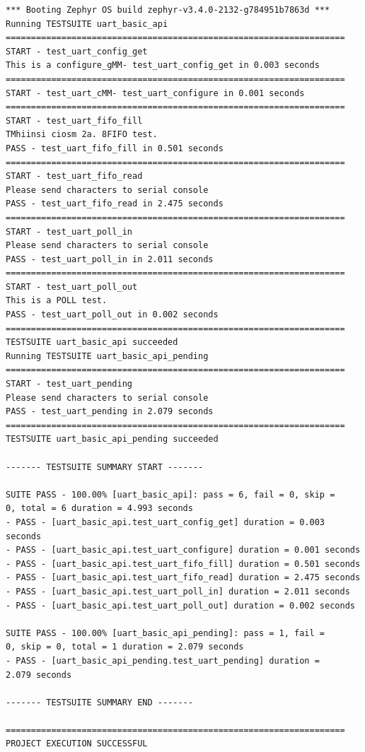 \documentclass[11pt,a4paper,oneside]{article}
\begin{document}
\begin{lstlisting}
*** Booting Zephyr OS build zephyr-v3.4.0-2132-g784951b7863d ***
Running TESTSUITE uart_basic_api
===================================================================
START - test_uart_config_get
This is a configure_gMM- test_uart_config_get in 0.003 seconds
===================================================================
START - test_uart_cMM- test_uart_configure in 0.001 seconds
===================================================================
START - test_uart_fifo_fill
TMhiinsi ciosm 2a. 8FIFO test.
PASS - test_uart_fifo_fill in 0.501 seconds
===================================================================
START - test_uart_fifo_read
Please send characters to serial console
PASS - test_uart_fifo_read in 2.475 seconds
===================================================================
START - test_uart_poll_in
Please send characters to serial console
PASS - test_uart_poll_in in 2.011 seconds
===================================================================
START - test_uart_poll_out
This is a POLL test.
PASS - test_uart_poll_out in 0.002 seconds
===================================================================
TESTSUITE uart_basic_api succeeded
Running TESTSUITE uart_basic_api_pending
===================================================================
START - test_uart_pending
Please send characters to serial console
PASS - test_uart_pending in 2.079 seconds
===================================================================
TESTSUITE uart_basic_api_pending succeeded

------- TESTSUITE SUMMARY START -------

SUITE PASS - 100.00% [uart_basic_api]: pass = 6, fail = 0, skip =
0, total = 6 duration = 4.993 seconds
- PASS - [uart_basic_api.test_uart_config_get] duration = 0.003 seconds
- PASS - [uart_basic_api.test_uart_configure] duration = 0.001 seconds
- PASS - [uart_basic_api.test_uart_fifo_fill] duration = 0.501 seconds
- PASS - [uart_basic_api.test_uart_fifo_read] duration = 2.475 seconds
- PASS - [uart_basic_api.test_uart_poll_in] duration = 2.011 seconds
- PASS - [uart_basic_api.test_uart_poll_out] duration = 0.002 seconds

SUITE PASS - 100.00% [uart_basic_api_pending]: pass = 1, fail =
0, skip = 0, total = 1 duration = 2.079 seconds
- PASS - [uart_basic_api_pending.test_uart_pending] duration =
2.079 seconds

------- TESTSUITE SUMMARY END -------

===================================================================
PROJECT EXECUTION SUCCESSFUL
\end{lstlisting}
\end{document}
